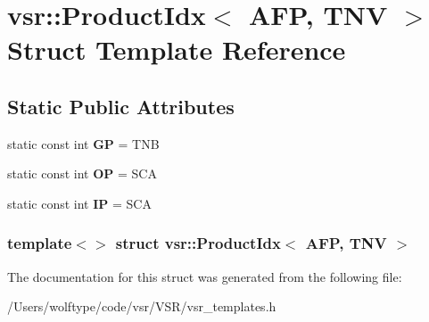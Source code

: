 \hypertarget{structvsr_1_1_product_idx_3_01_a_f_p_00_01_t_n_v_01_4}{\section{vsr\-:\-:Product\-Idx$<$ A\-F\-P, T\-N\-V $>$ Struct Template Reference}
\label{structvsr_1_1_product_idx_3_01_a_f_p_00_01_t_n_v_01_4}
}
\subsection*{Static Public Attributes}
\begin{DoxyCompactItemize}
\item 
\hypertarget{structvsr_1_1_product_idx_3_01_a_f_p_00_01_t_n_v_01_4_aaefc54f9e559d20abc431d44550ecd8d}{static const int {\bfseries G\-P} = T\-N\-B}\label{structvsr_1_1_product_idx_3_01_a_f_p_00_01_t_n_v_01_4_aaefc54f9e559d20abc431d44550ecd8d}

\item 
\hypertarget{structvsr_1_1_product_idx_3_01_a_f_p_00_01_t_n_v_01_4_a67b06bb66809ca7528dc1f0682516648}{static const int {\bfseries O\-P} = S\-C\-A}\label{structvsr_1_1_product_idx_3_01_a_f_p_00_01_t_n_v_01_4_a67b06bb66809ca7528dc1f0682516648}

\item 
\hypertarget{structvsr_1_1_product_idx_3_01_a_f_p_00_01_t_n_v_01_4_aacd5e2c859e0fe944f7216972f160aef}{static const int {\bfseries I\-P} = S\-C\-A}\label{structvsr_1_1_product_idx_3_01_a_f_p_00_01_t_n_v_01_4_aacd5e2c859e0fe944f7216972f160aef}

\end{DoxyCompactItemize}
\subsubsection*{template$<$$>$ struct vsr\-::\-Product\-Idx$<$ A\-F\-P, T\-N\-V $>$}



The documentation for this struct was generated from the following file\-:\begin{DoxyCompactItemize}
\item 
/\-Users/wolftype/code/vsr/\-V\-S\-R/vsr\-\_\-templates.\-h\end{DoxyCompactItemize}
